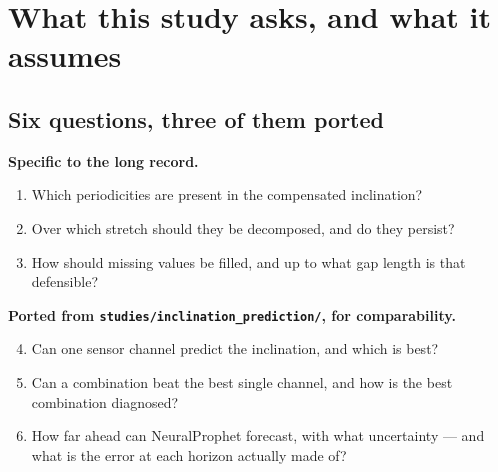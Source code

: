 \documentclass[11pt,a4paper]{article}
\begin{document}
\begin{abstract}
\textbf{A seventh question was raised by those answers and is addressed in
Section~\ref{sec:usable}: how much of the record can be used at all.} Everything
above was computed under an assumption stated in Section~\ref{sec:record} and
never tested --- that autoregressive work must run on one unbroken block. It need
not. An autoregressive model consumes windows, not a continuous series, and
fitting across every complete stretch of the era yields \textbf{6.57 annual
cycles and 2.26 times the training windows for 1.5\,\% fabricated data}. The
consequence is large: the deployable configuration's prediction intervals fall
from 164--185\,mdeg, which excluded nothing, to \textbf{12--23\,mdeg}, and its
one-hour error by 44\,\%, with no change to the model. The same comparison tests
a rule the companion framework asserts --- that one to two annual cycles suffice
for a yearly component --- and finds it half right: the longer span corrects the
annual amplitude but lets NeuralProphet's trend absorb \emph{more} of the
low-frequency variance, 53.8\,\% against 39.9.
\end{abstract}

\tableofcontents

\section{What this study asks, and what it assumes}

\subsection{Six questions, three of them ported}

\textbf{Specific to the long record.}
\begin{enumerate}
\item Which periodicities are present in the compensated inclination?
\item Over which stretch should they be decomposed, and do they persist?
\item How should missing values be filled, and up to what gap length is that
defensible?
\end{enumerate}

\textbf{Ported from \texttt{studies/inclination\_prediction/}, for
comparability.}
\begin{enumerate}
\setcounter{enumi}{3}
\item Can one sensor channel predict the inclination, and which is best?
\item Can a combination beat the best single channel, and how is the best
combination diagnosed?
\item How far ahead can NeuralProphet forecast, with what uncertainty --- and
what is the error at each horizon actually made of?
\end{enumerate}
\end{document}
